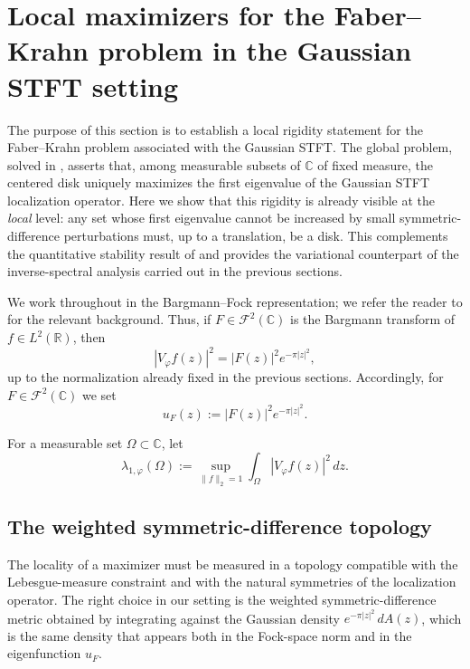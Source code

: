 \documentclass[a4paper,11pt,reqno]{amsart}
\numberwithin{equation}{section}
\theoremstyle{plain} %
\theoremstyle{definition} %
\theoremstyle{remark}
\newcommand{\R}{\mathbb{R}}
\newcommand{\C}{\mathbb{C}}
\begin{document}

\section{Local maximizers for the Faber--Krahn problem in the Gaussian STFT setting}\label{sec:local-max}

The purpose of this section is to establish a local rigidity statement for the
Faber--Krahn problem associated with the Gaussian STFT. The global problem,
solved in \cite{Nicola-Tilli}, asserts that, among measurable subsets of \(\C\)
of fixed measure, the centered disk uniquely maximizes the first eigenvalue of
the Gaussian STFT localization operator. Here we show that this rigidity is
already visible at the \emph{local} level: any set whose first eigenvalue cannot
be increased by small symmetric-difference perturbations must, up to a
translation, be a disk. This complements the quantitative stability result of
\cite{Gomez-Guerra-Ramos-Tilli} and provides the variational counterpart of the
inverse-spectral analysis carried out in the previous sections.

We work throughout in the Bargmann--Fock representation; we refer the reader to
\cite{Bargmann,Folland,Grochenig} for the relevant background. Thus, if
\(F\in \mathcal F^2(\C)\) is the Bargmann transform of \(f\in L^2(\R)\), then
\[
|V_\varphi f(z)|^2 = |F(z)|^2 e^{-\pi |z|^2},
\]
up to the normalization already fixed in the previous sections. Accordingly, for
\(F\in \mathcal F^2(\C)\) we set
\[
u_F(z):=|F(z)|^2 e^{-\pi |z|^2}.
\]

For a measurable set \(\Omega\subset \C\), let
\begin{equation}\label{eq:lambda1-def-sec6}
\lambda_{1,\varphi}(\Omega)
:=
\sup_{\|f\|_2=1}\int_\Omega |V_\varphi f(z)|^2\,dz.
\end{equation}

\subsection{The weighted symmetric-difference topology}

The locality of a maximizer must be measured in a topology compatible with the
Lebesgue-measure constraint and with the natural symmetries of the localization
operator. The right choice in our setting is the weighted symmetric-difference
metric obtained by integrating against the Gaussian density
\(e^{-\pi|z|^2}\,dA(z)\), which is the same density that appears both in the
Fock-space norm and in the eigenfunction \(u_F\).
\end{document}
